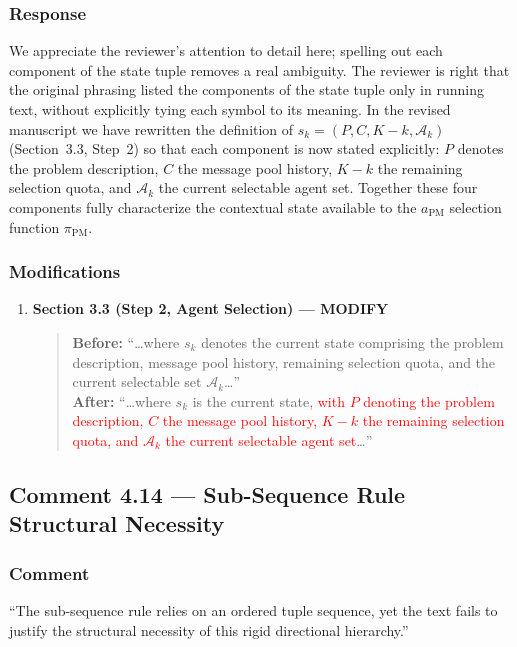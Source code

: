 \documentclass[11pt,a4paper]{article}
\begin{document}
\subsubsection{Response}
We appreciate the reviewer's attention to detail here; spelling out each component of the state tuple removes a real ambiguity. The reviewer is right that the original phrasing listed the components of the state tuple only in running text, without explicitly tying each symbol to its meaning. In the revised manuscript we have rewritten the definition of $s_k=(P, C, K-k, \mathcal{A}_k)$ (Section~3.3, Step~2) so that each component is now stated explicitly: $P$ denotes the problem description, $C$ the message pool history, $K-k$ the remaining selection quota, and $\mathcal{A}_k$ the current selectable agent set. Together these four components fully characterize the contextual state available to the $a_{\text{PM}}$ selection function $\pi_{\mathrm{PM}}$.

\subsubsection{Modifications}
\begin{enumerate}
\item \textbf{Section 3.3 (Step 2, Agent Selection) --- MODIFY}
\begin{quote}
\textbf{Before:} ``\ldots where $s_k$ denotes the current state comprising the problem description, message pool history, remaining selection quota, and the current selectable set $\mathcal{A}_k$\ldots''\\[4pt]
\textbf{After:} ``\ldots where $s_k$ is the current state, \textcolor{red}{with $P$ denoting the problem description, $C$ the message pool history, $K-k$ the remaining selection quota, and $\mathcal{A}_k$ the current selectable agent set}\ldots''
\end{quote}
\end{enumerate}

\subsection{Comment 4.14 --- Sub-Sequence Rule Structural Necessity}

\subsubsection{Comment}
``The sub-sequence rule relies on an ordered tuple sequence, yet the text fails to justify the structural necessity of this rigid directional hierarchy.''
\end{document}
